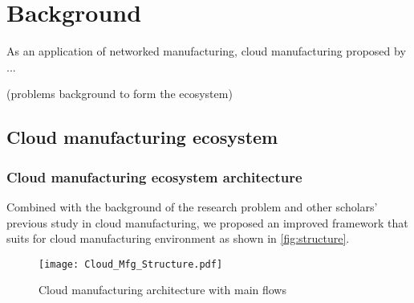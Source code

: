 \section{Background} %
\label{sec:background}

As an application of networked manufacturing, cloud manufacturing proposed by ...

(problems background to form the ecosystem)

\subsection{Cloud manufacturing ecosystem} %
\label{sub:cloud_manufacturing_ecosystem}

\subsubsection{Cloud manufacturing ecosystem architecture}

Combined with the background of the research problem and other scholars' previous study in cloud manufacturing, we proposed an improved framework that suits for cloud manufacturing environment as shown in \autoref{fig:structure}.
\begin{figure}[htbp]
\centering
\texttt{[image: Cloud\_Mfg\_Structure.pdf]}
\caption{Cloud manufacturing architecture with main flows}
\label{fig:structure}
\end{figure}

